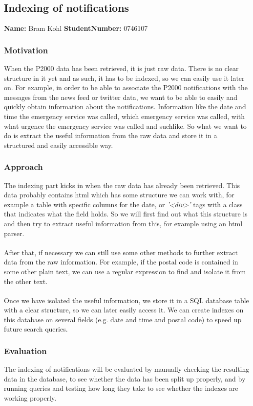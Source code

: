 \subsection{Indexing of notifications}
\textbf{Name:} Bram Kohl \indent \textbf{StudentNumber:} 0746107

\subsubsection*{Motivation}
When the P2000 data has been retrieved, it is just raw data. There is no clear structure in it yet and as such, it has to be indexed, so we can easily use it later on. For example, in order to be able to associate the P2000 notifications with the messages from the news feed or twitter data, we want to be able to easily and quickly obtain information about the notifications. Information like the date and time the emergency service was called, which emergency service was called, with what urgence the emergency service was called and suchlike. So what we want to do is extract the useful information from the raw data and store it in a structured and easily accessible way.
\subsubsection*{Approach}
The indexing part kicks in when the raw data has already been retrieved. This data probably contains html which has some structure we can work with,  for example a table with specific columns for the date, or \textit{'<div>'} tags with a class that indicates what the field holds. So we will first find out what this structure is and then try to extract useful information from this, for example using an html parser.\\\\
After that, if necessary we can still use some other methods to further extract data from the raw information. For example, if the postal code is contained in some other plain text, we can use a regular expression to find and isolate it from the other text.\\\\
Once we have isolated the useful information, we store it in a SQL database table with a clear structure, so we can later easily access it. We can create indexes on this database on several fields (e.g. date and time and postal code) to speed up future search queries.
\subsubsection*{Evaluation}
The indexing of notifications will be evaluated by manually checking the resulting data in the database, to see whether the data has been split up properly, and by running queries and testing how long they take to see whether the indexes are working properly.